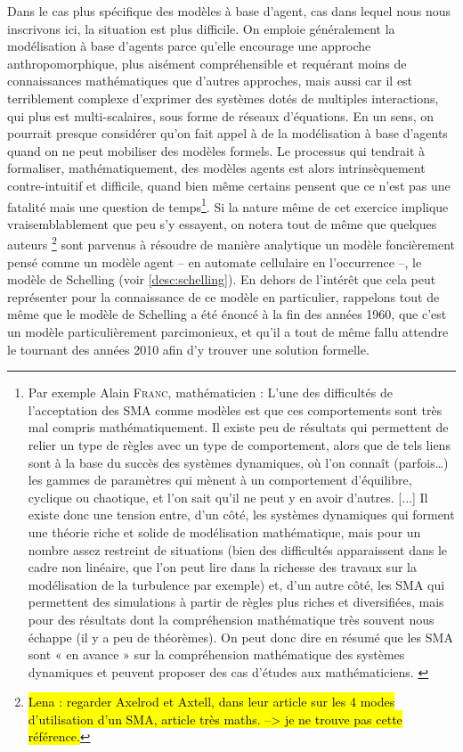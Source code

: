 Dans le cas plus spécifique des modèles à base d'agent, cas dans lequel nous nous inscrivons ici, la situation est plus difficile.
On emploie généralement la modélisation à base d'agents parce qu'elle encourage une approche anthropomorphique, plus aisément compréhensible et requérant moins de connaissances mathématiques que d'autres approches, mais aussi car il est terriblement complexe d'exprimer des systèmes dotés de multiples interactions, qui plus est multi-scalaires, sous forme de réseaux d'équations.
En un sens, on pourrait presque considérer qu'on fait appel à de la modélisation à base d'agents quand on ne peut mobiliser des modèles formels.
Le processus qui tendrait à formaliser, mathématiquement, des modèles agents est alors intrinsèquement contre-intuitif et difficile, quand bien même certains pensent que ce n'est pas une fatalité mais une question de temps\footnote{
	Par exemple Alain \textsc{Franc}, mathématicien :
	\og L’une des difficultés de l’acceptation des SMA comme modèles est que ces comportements sont très mal compris mathématiquement.
	Il existe peu de résultats qui permettent de relier un type de règles avec un type de comportement, alors que de tels liens sont à la base du succès des systèmes dynamiques, où l’on connaît (parfois\ldots) les gammes de paramètres qui mènent à un comportement d’équilibre, cyclique ou chaotique, et l’on sait qu’il ne peut y en avoir d’autres.
	[...]
	Il existe donc une tension entre, d’un côté, les systèmes dynamiques qui forment une théorie riche et solide de modélisation mathématique, mais pour un nombre assez restreint de situations (bien des difficultés apparaissent dans le cadre non linéaire, que l’on peut lire dans la richesse des travaux sur la modélisation de la turbulence par exemple) et, d’un autre côté, les SMA qui permettent des simulations à partir de règles plus riches et diversifiées, mais pour des résultats dont la compréhension mathématique très souvent nous échappe (il y a peu de théorèmes).
	On peut donc dire en résumé que les SMA sont « en avance » sur la compréhension mathématique des systèmes dynamiques et peuvent proposer des cas d’études aux mathématiciens.\fg{}
	\autocite[Annexe 2, \og Retour sur les SMA comme outil et cadre conceptuel de modélisation.\fg{}, pp. 479-482 ]{ouriachi_lelaboration_2018}
}.
Si la nature même de cet exercice implique vraisemblablement que peu s'y essayent, on notera tout de même que quelques auteurs \autocite{zhang_tipping_2011,grauwin_dynamic_2012}\footnote{
	\hl{Lena : regarder Axelrod et Axtell, dans leur article sur les 4 modes d'utilisation d'un SMA, article très maths. --> je ne trouve pas cette référence.}
} sont parvenus à résoudre de manière analytique un modèle foncièrement pensé comme un modèle agent -- en automate cellulaire en l'occurrence --, le modèle de Schelling (voir \cref{desc:schelling}).
En dehors de l'intérêt que cela peut représenter pour la connaissance de ce modèle en particulier, rappelons tout de même que le modèle de Schelling a été énoncé à la fin des années 1960, que c'est un modèle particulièrement parcimonieux, et qu'il a tout de même fallu attendre le tournant des années 2010 afin d'y trouver une solution formelle.

